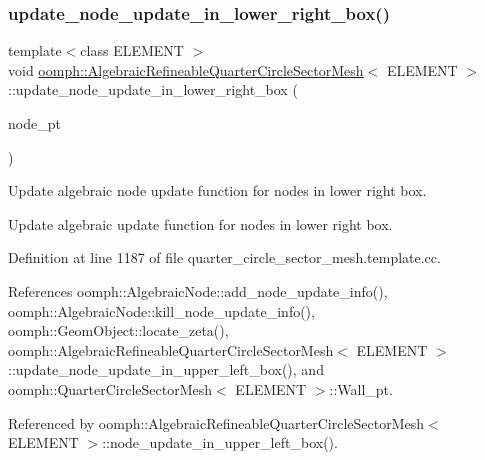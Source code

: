 \subsubsection{\texorpdfstring{update\+\_\+node\+\_\+update\+\_\+in\+\_\+lower\+\_\+right\+\_\+box()}{update\_node\_update\_in\_lower\_right\_box()}}
{\footnotesize\ttfamily template$<$class E\+L\+E\+M\+E\+NT $>$ \\
void \hyperlink{classoomph_1_1AlgebraicRefineableQuarterCircleSectorMesh}{oomph\+::\+Algebraic\+Refineable\+Quarter\+Circle\+Sector\+Mesh}$<$ E\+L\+E\+M\+E\+NT $>$\+::update\+\_\+node\+\_\+update\+\_\+in\+\_\+lower\+\_\+right\+\_\+box (\begin{DoxyParamCaption}\item[{\hyperlink{classoomph_1_1AlgebraicNode}{Algebraic\+Node} $\ast$\&}]{node\+\_\+pt }\end{DoxyParamCaption})\hspace{0.3cm}{\ttfamily [private]}}



Update algebraic node update function for nodes in lower right box. 

Update algebraic update function for nodes in lower right box. 

Definition at line 1187 of file quarter\+\_\+circle\+\_\+sector\+\_\+mesh.\+template.\+cc.



References oomph\+::\+Algebraic\+Node\+::add\+\_\+node\+\_\+update\+\_\+info(), oomph\+::\+Algebraic\+Node\+::kill\+\_\+node\+\_\+update\+\_\+info(), oomph\+::\+Geom\+Object\+::locate\+\_\+zeta(), oomph\+::\+Algebraic\+Refineable\+Quarter\+Circle\+Sector\+Mesh$<$ E\+L\+E\+M\+E\+N\+T $>$\+::update\+\_\+node\+\_\+update\+\_\+in\+\_\+upper\+\_\+left\+\_\+box(), and oomph\+::\+Quarter\+Circle\+Sector\+Mesh$<$ E\+L\+E\+M\+E\+N\+T $>$\+::\+Wall\+\_\+pt.



Referenced by oomph\+::\+Algebraic\+Refineable\+Quarter\+Circle\+Sector\+Mesh$<$ E\+L\+E\+M\+E\+N\+T $>$\+::node\+\_\+update\+\_\+in\+\_\+upper\+\_\+left\+\_\+box().

\mbox{\label{classoomph_1_1AlgebraicRefineableQuarterCircleSectorMesh_ab1e4847ffef953e66aafff14f35b7141}} 
